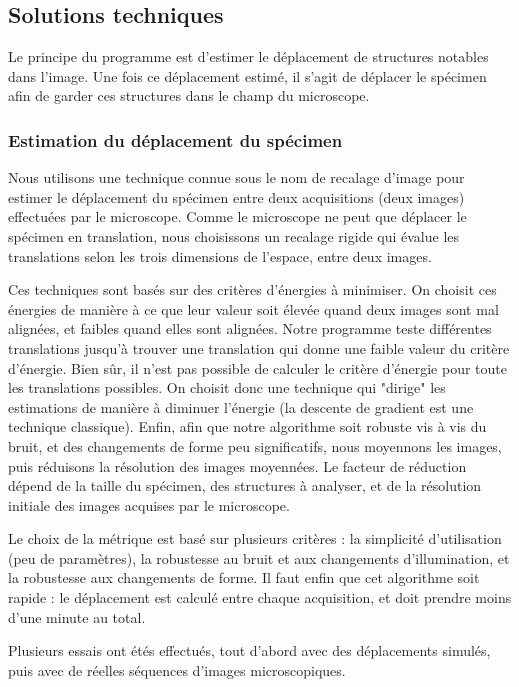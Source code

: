 \subsection{Solutions techniques}

Le principe du programme est d'estimer le déplacement de structures notables dans l'image.
Une fois ce déplacement estimé, il s'agit de déplacer le spécimen afin de garder ces structures dans le champ du microscope.

\subsubsection{Estimation du déplacement du spécimen}
Nous utilisons une technique connue sous le nom de recalage d'image pour estimer le déplacement du spécimen entre deux acquisitions (deux images) effectuées par le microscope.
Comme le microscope ne peut que déplacer le spécimen en translation, nous choisissons un recalage rigide qui évalue les translations selon les trois dimensions de l'espace, entre deux images.

Ces techniques sont basés sur des critères d'énergies à minimiser.
On choisit ces énergies de manière à ce que leur valeur soit élevée quand deux images sont mal alignées,
et faibles quand elles sont alignées. Notre programme teste différentes translations jusqu'à trouver une translation
qui donne une faible valeur du critère d'énergie.
Bien sûr, il n'est pas possible de calculer le critère d'énergie pour toute les translations possibles.
On choisit donc une technique qui "dirige" les estimations de manière à diminuer l'énergie
(la descente de gradient est une technique classique).
Enfin, afin que notre algorithme soit robuste vis à vis du bruit, et des changements de forme peu significatifs,
nous moyennons les images, puis réduisons la résolution des images moyennées.
Le facteur de réduction dépend de la taille du spécimen, des structures à analyser,
et de la résolution initiale des images acquises par le microscope.

Le choix de la métrique est basé sur plusieurs critères : la simplicité d'utilisation (peu de paramètres),
la robustesse au bruit et aux changements d'illumination, et la robustesse aux changements de forme. Il faut enfin que cet algorithme soit rapide : le déplacement est calculé entre chaque acquisition, et doit prendre moins d'une minute au total.

Plusieurs essais ont étés effectués, tout d'abord avec des déplacements simulés,
puis avec de réelles séquences d'images microscopiques.

